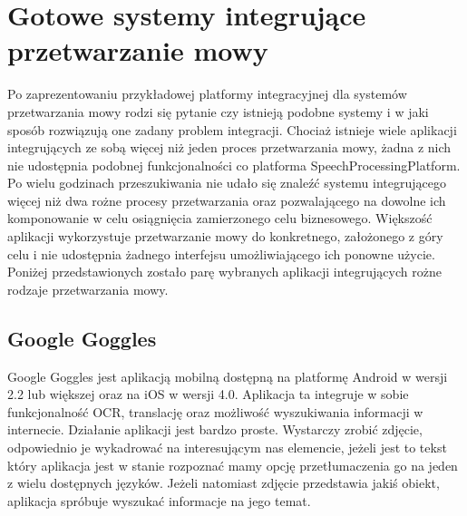 


\ifpdf
    \graphicspath{{5/figures/PNG/}{5/figures/PDF/}{5/figures/}}
\else
    \graphicspath{{5/figures/EPS/}{5/figures/}}
\fi

\chapter{Gotowe systemy integrujące przetwarzanie mowy} %

Po zaprezentowaniu przykładowej platformy integracyjnej dla systemów przetwarzania mowy rodzi się pytanie czy istnieją podobne systemy i w jaki sposób rozwiązują one zadany problem integracji. Chociaż istnieje wiele aplikacji integrujących ze sobą więcej niż jeden proces przetwarzania mowy, żadna z nich nie udostępnia podobnej funkcjonalności co platforma SpeechProcessingPlatform. Po wielu godzinach przeszukiwania nie udało się znaleźć systemu integrującego więcej niż dwa rożne procesy przetwarzania oraz pozwalającego na dowolne ich komponowanie w celu osiągnięcia zamierzonego celu biznesowego. Większość aplikacji wykorzystuje przetwarzanie mowy do konkretnego, założonego z góry celu i nie udostępnia żadnego interfejsu umożliwiającego ich ponowne użycie. Poniżej przedstawionych zostało parę wybranych aplikacji integrujących rożne rodzaje przetwarzania mowy.

\section {Google Goggles}

Google Goggles\cite{googlegoggles} jest aplikacją mobilną dostępną na platformę Android w wersji 2.2 lub większej oraz na iOS w wersji 4.0. Aplikacja ta integruje w sobie funkcjonalność OCR, translację oraz możliwość wyszukiwania informacji w internecie. Działanie aplikacji jest bardzo proste. Wystarczy zrobić zdjęcie, odpowiednio je wykadrować na interesującym nas elemencie, jeżeli jest to tekst który aplikacja jest w stanie rozpoznać mamy opcję przetłumaczenia go na jeden z wielu dostępnych języków. Jeżeli natomiast zdjęcie przedstawia jakiś obiekt, aplikacja spróbuje wyszukać informacje na jego temat.	

